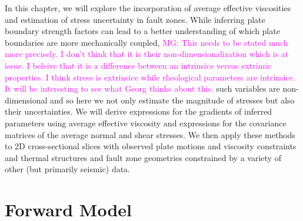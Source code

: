 \documentclass[12pt]{article}
\newcommand{\mgnote}[1]{\textcolor{magenta}{MG: #1}}
\begin{document}
In this chapter, we will explore the incorporation of average effective viscosities and estimation of stress uncertainty in fault zones. While inferring plate boundary strength factors \citep{ratnaswamy2015adjoint} can lead to a better understanding of which plate boundaries are more mechanically coupled, \mgnote{This needs to be stated much more precisely. I don't think that it is their non-dimensionalization which is at issue. I beleive that it is a difference between an intrinsice versus extrinsic properties. I think stress is extrinsice while rheological parameters are intrinsice. It will be interesting to see what Georg thinks about this.} such variables are non-dimensional and so here we not only estimate the magnitude of  stresses but also their uncertainties. We will derive expressions for the gradients of inferred parameters using average effective viscosity and expressions for the covariance matrices of the average normal and shear stresses. We then apply these methods to 2D cross-sectional slices with observed plate motions and viscosity constraints and thermal structures and fault zone geometries constrained by a variety of other (but primarily seismic) data.
 
\section{Forward Model}
\end{document}
